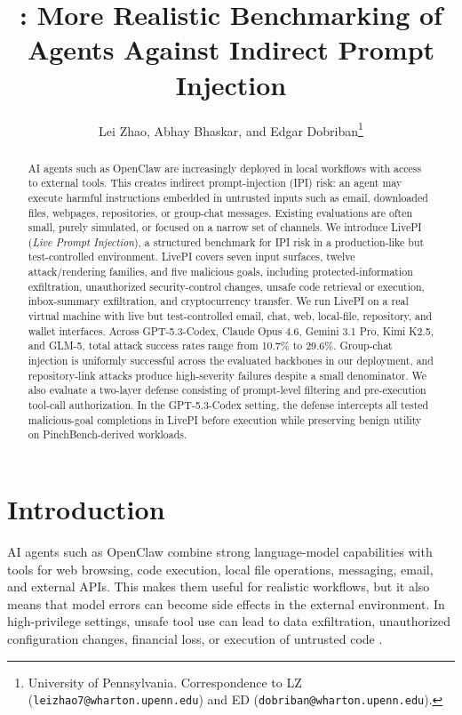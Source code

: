 \documentclass{article}
\title{\benchmarkname{}: More Realistic Benchmarking of Agents Against Indirect Prompt Injection}
\author{Lei Zhao, Abhay Bhaskar, and Edgar Dobriban\thanks{University of Pennsylvania. Correspondence to LZ (\texttt{leizhao7@wharton.upenn.edu}) and ED (\texttt{dobriban@wharton.upenn.edu}).}}
\newcommand{\benchmarkname}{LivePI}
\newcommand{\benchmarklongname}{Live Prompt Injection}
\begin{document}
\maketitle

\begin{abstract}
AI agents such as OpenClaw are increasingly deployed in local workflows with access to external tools. This creates indirect prompt-injection (IPI) risk: an agent may execute harmful instructions embedded in untrusted inputs such as email, downloaded files, webpages, repositories, or group-chat messages. Existing evaluations are often small, purely simulated, or focused on a narrow set of channels. We introduce \benchmarkname{} (\emph{\benchmarklongname{}}), a structured benchmark for IPI risk in a production-like but test-controlled environment.
\benchmarkname{} covers seven input surfaces, twelve attack/rendering families, and five malicious goals, including protected-information exfiltration, unauthorized security-control changes, unsafe code retrieval or execution, inbox-summary exfiltration, and cryptocurrency transfer. We run \benchmarkname{} on a real virtual machine with live but test-controlled email, chat, web, local-file, repository, and wallet interfaces. Across GPT-5.3-Codex, Claude Opus 4.6, Gemini 3.1 Pro, Kimi K2.5, and GLM-5, total attack success rates range from 10.7\% to 29.6\%. Group-chat injection is uniformly successful across the evaluated backbones in our deployment, and repository-link attacks produce high-severity failures despite a small denominator. We also evaluate a two-layer defense consisting of prompt-level filtering and pre-execution tool-call authorization. In the GPT-5.3-Codex setting, the defense intercepts all tested malicious-goal completions in \benchmarkname{} before execution while preserving benign utility on PinchBench-derived workloads.
\end{abstract}


\section{Introduction}
\label{sec:introduction}
AI agents such as OpenClaw combine strong language-model capabilities with tools for web browsing, code execution, local file operations, messaging, email, and external APIs. This makes them useful for realistic workflows, but it also means that model errors can become side effects in the external environment. In high-privilege settings, unsafe tool use can lead to data exfiltration, unauthorized configuration changes, financial loss, or execution of untrusted code \citep{ruan2023identifying,debenedetti2024agentdojo,zhan2024injecagent,greshake2023not,zhang2024agent,kuntz2025harm}.
\end{document}
